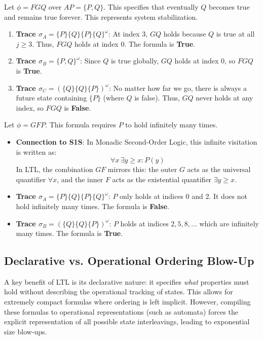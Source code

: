 \begin{example}
Let $\phi = F G Q$ over $AP = \{P, Q\}$. This specifies that eventually $Q$ becomes true and remains true forever. This represents system stabilization.
\begin{enumerate}
    \item \textbf{Trace $\sigma_A = \{P\}\{Q\}\{P\}\{Q\}^\omega$}:
          At index 3, $G Q$ holds because $Q$ is true at all $j \ge 3$. Thus, $F G Q$ holds at index 0. The formula is \textbf{True}.
    \item \textbf{Trace $\sigma_B = \{P, Q\}^\omega$}:
          Since $Q$ is true globally, $G Q$ holds at index 0, so $F G Q$ is \textbf{True}.
    \item \textbf{Trace $\sigma_C = (\{Q\}\{Q\}\{P\})^\omega$}:
          No matter how far we go, there is always a future state containing $\{P\}$ (where $Q$ is false). Thus, $G Q$ never holds at any index, so $F G Q$ is \textbf{False}.
\end{enumerate}
\end{example}

\begin{example}
Let $\phi = G F P$. This formula requires $P$ to hold infinitely many times.
\begin{itemize}
    \item \textbf{Connection to S1S}: In Monadic Second-Order Logic, this infinite visitation is written as:
          \[
            \forall x \, \exists y \ge x : P(y)
          \]
          In LTL, the combination $G F$ mirrors this: the outer $G$ acts as the universal quantifier $\forall x$, and the inner $F$ acts as the existential quantifier $\exists y \ge x$.
    \item \textbf{Trace $\sigma_A = \{P\}\{Q\}\{P\}\{Q\}^\omega$}:
          $P$ only holds at indices 0 and 2. It does not hold infinitely many times. The formula is \textbf{False}.
    \item \textbf{Trace $\sigma_B = (\{Q\}\{Q\}\{P\})^\omega$}:
          $P$ holds at indices $2, 5, 8, \dots$ which are infinitely many times. The formula is \textbf{True}.
\end{itemize}
\end{example}

\subsection{Declarative vs. Operational Ordering Blow-Up}
A key benefit of LTL is its declarative nature: it specifies \emph{what} properties must hold without describing the operational tracking of states. This allows for extremely compact formulas where ordering is left implicit. However, compiling these formulas to operational representations (such as automata) forces the explicit representation of all possible state interleavings, leading to exponential size blow-ups.

